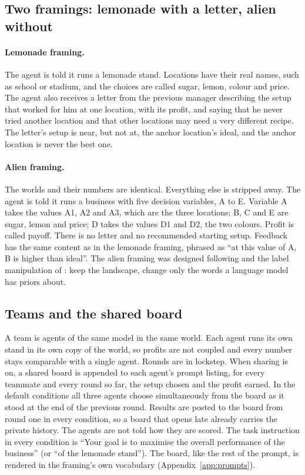 \subsection{Two framings: lemonade with a letter, alien without}\label{sec:framings}

\paragraph{Lemonade framing.}
The agent is told it runs a lemonade stand. Locations have their real names, such as school or stadium, and
the choices are called sugar, lemon, colour and price. The agent also receives a letter from the previous
manager describing the setup that worked for him at one location, with its profit, and saying that he never
tried another location and that other locations may need a very different recipe. The letter's setup is near,
but not at, the anchor location's ideal, and the anchor location is never the best one.

\paragraph{Alien framing.}
The worlds and their numbers are identical. Everything else is stripped away. The agent is told it runs a
business with five decision variables, A to E. Variable A takes the values A1, A2 and A3, which are the three
locations; B, C and E are sugar, lemon and price; D takes the values D1 and D2, the two colours. Profit is
called payoff. There is no letter and no recommended starting setup. Feedback has the same content as in the
lemonade framing, phrased as ``at this value of A, B is higher than ideal''. The alien framing was designed
following \citet{billinger2014search} and the label manipulation of \citet{austin2026semantic}: keep the
landscape, change only the words a language model has priors about.

\subsection{Teams and the shared board}\label{sec:board}

A team is \NAgents{} agents of the same model in the same world. Each agent runs its own stand in its own copy
of the world, so profits are not coupled and every number stays comparable with a single agent. Rounds are in
lockstep. When sharing is on, a shared board is appended to each agent's prompt listing, for every teammate and
every round so far, the setup chosen and the profit earned. In the default conditions all three agents choose
simultaneously from the board as it stood at the end of the previous round. Results are posted to the board
from round one in every condition, so a board that opens late already carries the private history. The
agents are not told how they are scored. The task instruction in every condition is ``Your goal is to
maximise the overall performance of the business'' (or ``of the lemonade stand''). The board, like the rest
of the prompt, is rendered in the framing's own vocabulary (Appendix~\ref{app:prompts}).

